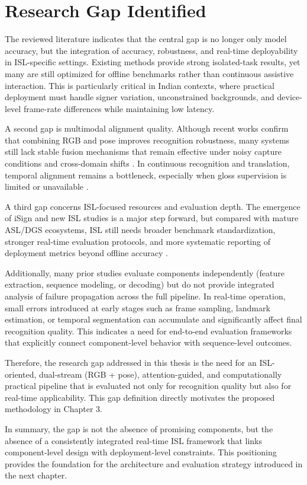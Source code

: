 \section{Research Gap Identified}
The reviewed literature indicates that the central gap is no longer only model accuracy, but the integration of accuracy, robustness, and real-time deployability in ISL-specific settings. Existing methods provide strong isolated-task results, yet many are still optimized for offline benchmarks rather than continuous assistive interaction. This is particularly critical in Indian contexts, where practical deployment must handle signer variation, unconstrained backgrounds, and device-level frame-rate differences while maintaining low latency.

A second gap is multimodal alignment quality. Although recent works confirm that combining RGB and pose improves recognition robustness, many systems still lack stable fusion mechanisms that remain effective under noisy capture conditions and cross-domain shifts \cite{geetha2025toward,yenisari2025deep}. In continuous recognition and translation, temporal alignment remains a bottleneck, especially when gloss supervision is limited or unavailable \cite{camgoz2020transformers,yin2023gaslt,zhang2024scaling}.

A third gap concerns ISL-focused resources and evaluation depth. The emergence of iSign and new ISL studies is a major step forward, but compared with mature ASL/DGS ecosystems, ISL still needs broader benchmark standardization, stronger real-time evaluation protocols, and more systematic reporting of deployment metrics beyond offline accuracy \cite{joshi2024isign,alqurishi2021deep,alabdullah2024advancements}. 

Additionally, many prior studies evaluate components independently (feature extraction, sequence modeling, or decoding) but do not provide integrated analysis of failure propagation across the full pipeline. In real-time operation, small errors introduced at early stages such as frame sampling, landmark estimation, or temporal segmentation can accumulate and significantly affect final recognition quality. This indicates a need for end-to-end evaluation frameworks that explicitly connect component-level behavior with sequence-level outcomes.

Therefore, the research gap addressed in this thesis is the need for an ISL-oriented, dual-stream (RGB + pose), attention-guided, and computationally practical pipeline that is evaluated not only for recognition quality but also for real-time applicability. This gap definition directly motivates the proposed methodology in Chapter 3.

In summary, the gap is not the absence of promising components, but the absence of a consistently integrated real-time ISL framework that links component-level design with deployment-level constraints. This positioning provides the foundation for the architecture and evaluation strategy introduced in the next chapter.
